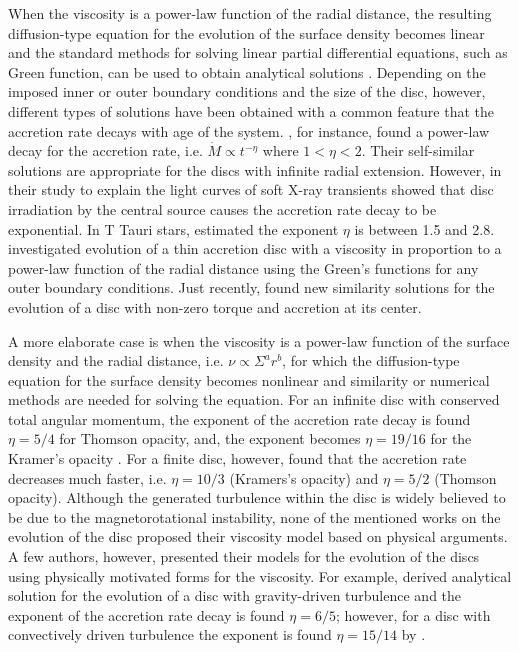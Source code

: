 \documentclass[apj]{emulateapj}
\begin{document}
When the viscosity is a power-law function of the radial distance, the resulting diffusion-type equation for the evolution of the surface density becomes linear and the standard methods for solving linear partial differential equations, such as Green function, can be used to obtain  analytical solutions \citep[e.g.,][]{lynden74,pringle91,tanaka2011,Lipu15}. Depending on the imposed inner or outer boundary conditions and  the size of the disc, however, different types of solutions have been obtained with a common feature that the accretion rate decays with age of the system. \cite{lynden74}, for instance, found a power-law decay for the accretion rate, i.e. $\dot{M} \propto t^{-\eta}$ where $1<\eta <2$. Their self-similar solutions  are appropriate for the discs with infinite radial extension. However, \cite{king98} in their study to explain the light curves of soft X-ray transients showed that disc irradiation by the central source causes the accretion rate decay to be exponential.  In T Tauri stars, \cite{hartmann98} estimated the exponent $\eta$ is between 1.5 and 2.8. \cite{Lipu15} investigated evolution of a thin accretion disc with a viscosity in proportion to a power-law function of the radial distance using the Green's functions for any outer boundary conditions. Just recently, \cite{rafikov16} found new similarity solutions for the evolution of a disc with non-zero torque and accretion at its center. 

A more elaborate  case is when the viscosity is a power-law function of the surface density and the radial distance, i.e. $\nu \propto \Sigma^a r^b$, for which the diffusion-type equation for the surface density becomes nonlinear and similarity or numerical methods are needed for solving the equation. For an infinite disc with conserved total angular momentum, the exponent of the accretion rate decay is found $\eta = 5/4$ for Thomson opacity, and, the exponent becomes $\eta =19/16$ for the Kramer's opacity \citep[e.g.,][]{filipov, cannizzo}. For a finite disc, however, \cite{lipu2000}  found that the accretion rate decreases much faster, i.e. $\eta = 10/3$ (Kramers's opacity) and $\eta =5/2$ (Thomson opacity). Although the generated turbulence within the disc is widely believed to be due to the magnetorotational instability,  none of the mentioned works on the evolution of the disc proposed their viscosity model based on physical arguments. A few authors, however, presented their models for the evolution of the discs using physically motivated forms for the viscosity. For example, \cite{lin87} derived analytical solution for the evolution of a disc with gravity-driven turbulence and the exponent of the accretion rate decay is found $\eta = 6/5$; however, for a disc with convectively driven turbulence the exponent is found $\eta = 15/14$ by \cite{lin82}.
\end{document}
